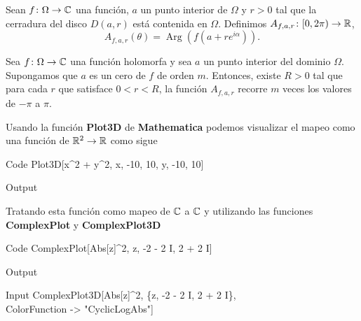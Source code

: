\begin{defi}
	Sean $f\colon \Omega\to\mathbb{C}$ una función, $a$ un punto interior de $\Omega$ y $r>0$ tal que la cerradura del disco $D(a,r)$ está contenida en $\Omega$. Definimos $A_{f,a,r}\colon[0,2\pi)\to\mathbb{R}$,
	\[
	A_{f,a,r}(\theta) = \operatorname{Arg}(f(a+re^{i\alpha})).
	\]
\end{defi}

\begin{teor}
	Sea $f\colon \Omega\to\mathbb{C}$ una función holomorfa
	y sea $a$ un punto interior del dominio $\Omega$.
	Supongamos que $a$ es un cero de $f$ de orden $m$.
	Entonces, existe $R>0$ tal que para cada $r$ que satisface $0<r<R$,
	la función $A_{f,a,r}$ recorre $m$ veces los valores de $-\pi$ a $\pi$.
\end{teor}

\noindent Usando la función \textbf{Plot3D} de \textbf{Mathematica} podemos visualizar el mapeo como una función de $\mathbb{R}^2 \rightarrow \mathbb{R}$ como sigue
\begin{mmaCell}[functionlocal=y]{Code}
	  Plot3D[x^2 + y^2, {x, -10, 10}, {y, -10, 10}]
\end{mmaCell}

\begin{mmaCell}[moregraphics={moreig={scale=.4}}]{Output}
\end{mmaCell}

Tratando esta función como mapeo de $\mathbb{C}$ a $\mathbb{C}$ y utilizando las funciones \textbf{ComplexPlot} y \textbf{ComplexPlot3D}

\begin{mmaCell}[functionlocal=y]{Code}
	 ComplexPlot[Abs[z]^2, {z, -2 - 2 I, 2 + 2 I}]
\end{mmaCell}

\begin{mmaCell}[moregraphics={moreig={scale=.35}}]{Output}
\end{mmaCell}

\begin{mmaCell}{Input}
  ComplexPlot3D[Abs[z]^2, \{z, -2 - 2 I, 2 + 2 I\},\\ColorFunction -> "CyclicLogAbs"]
\end{mmaCell}

